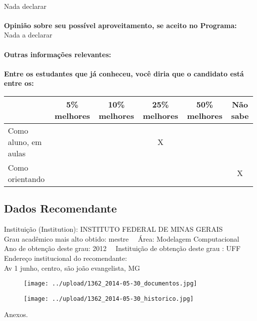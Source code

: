 \documentclass[11pt]{article}
\begin{document}
\\Nada declarar\\
\\
\textbf{Opinião sobre seu possível aproveitamento, se aceito no Programa:}
\\Nada a declarar\\ 
\\
\textbf{Outras informações relevantes:} \\
\\[0.3cm]
\textbf{Entre os estudantes que já conheceu, você diria que o candidato está entre os:}
\\
\begin{tabular}{|l|c|c|c|c|c|}
\hline
 & 5\% melhores & 10\% melhores & 25\% melhores & 50\% melhores & Não sabe \\
\hline
Como aluno, em aulas &  &  & X &  & \\
\hline
Como orientando &  &  &  &  & X\\
\hline
\end{tabular}
\subsection*{Dados Recomendante} 
	Instituição (Institution): INSTITUTO FEDERAL DE MINAS GERAIS
\\ 
	Grau acadêmico mais alto obtido: mestre
	\ \ Área: Modelagem Computacional  
	\\
	Ano de obtenção deste grau: 2012
	\ \ 
	Instituição de obtenção deste grau : UFF
	\\ 
	Endereço institucional do recomendante: \\ Av 1 junho, centro, são joão evangelista, MG	
\begin{figure}[!htb]
\texttt{[image: ../upload/1362\_2014-05-30\_documentos.jpg]}
\end{figure}	
\begin{figure}[!htb]
\texttt{[image: ../upload/1362\_2014-05-30\_historico.jpg]}
\end{figure} 
\begin{center}
Anexos.
\end{center}
\end{document}
